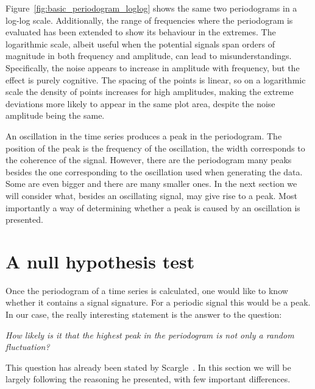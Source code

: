 Figure~\ref{fig:basic_periodogram_loglog} shows the same two periodograms in a log-log scale. Additionally, the range of frequencies where the periodogram is evaluated has been extended to show its behaviour in the extremes. The logarithmic scale, albeit useful when the potential signals span orders of magnitude in both frequency and amplitude, can lead to misunderstandings. Specifically, the noise appears to increase in amplitude with frequency, but the effect is purely cognitive. The spacing of the points is linear, so on a logarithmic scale the density of points increases for high amplitudes, making the extreme deviations more likely to appear in the same plot area, despite the noise amplitude being the same.

An oscillation in the time series produces a peak in the periodogram. The position of the peak is the frequency of the oscillation, the width corresponds to the coherence of the signal. However, there are the periodogram many peaks besides the one corresponding to the oscillation used when generating the data. Some are even bigger and there are many smaller ones. In the next section we will consider what, besides an oscillating signal, may give rise to a peak. Most importantly a way of determining whether a peak is caused by an oscillation is presented.




\section{A null hypothesis test}
\label{sec:a_null_hypothesis_test}
Once the periodogram of a time series is calculated, one would like to know whether it contains a signal signature. For a periodic signal this would be a peak. In our case, the really interesting statement is the answer to the question:

\begin{center}
  \emph{How likely is it that the highest peak in the periodogram is not only a random fluctuation?}
\end{center}


This question has already been stated by Scargle~\cite{Scargle1982}. In this section we will be largely following the reasoning he presented, with few important differences.

